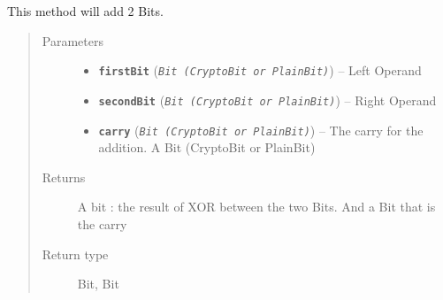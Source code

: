 \documentclass[letterpaper,10pt,english]{sphinxmanual}
\begin{document}
\begin{fulllineitems}
\label{datatypes.integers:datatypes.integers.Utility.completeAddOnOneBit}
This method will add 2 Bits.
\begin{quote}\begin{description}
\item[{Parameters}] \leavevmode\begin{itemize}
\item {} 
\textbf{\texttt{firstBit}} (\emph{\texttt{Bit (CryptoBit or PlainBit)}}) -- Left Operand

\item {} 
\textbf{\texttt{secondBit}} (\emph{\texttt{Bit (CryptoBit or PlainBit)}}) -- Right Operand

\item {} 
\textbf{\texttt{carry}} (\emph{\texttt{Bit (CryptoBit or PlainBit)}}) -- The carry for the addition. A Bit (CryptoBit or PlainBit)

\end{itemize}

\item[{Returns}] \leavevmode
A bit : the result of XOR between the two Bits. And a Bit that is the carry

\item[{Return type}] \leavevmode
Bit, Bit

\end{description}\end{quote}

\end{fulllineitems}

\end{document}
